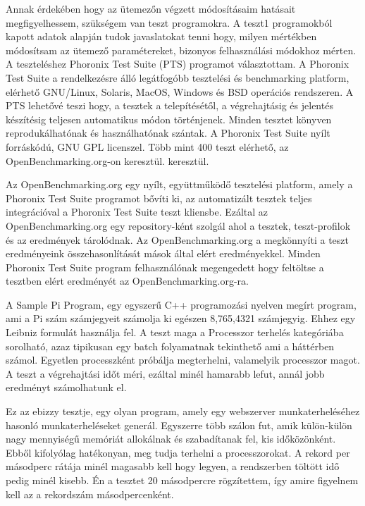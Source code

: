 
Annak érdekében hogy az ütemezőn végzett módosításaim hatásait megfigyelhessem, szükségem van teszt programokra. A teszt1 programokból kapott adatok alapján tudok javaslatokat tenni hogy, milyen mértékben módosítsam az ütemező paramétereket, bizonyos felhasználási módokhoz mérten.
A teszteléshez Phoronix Test Suite (PTS) programot választottam.
A Phoronix Test Suite a rendelkezésre álló legátfogóbb tesztelési és benchmarking platform, elérhető GNU/Linux, Solaris, MacOS, Windows és BSD operációs rendszeren.
A PTS lehetővé teszi hogy, a tesztek a telepítésétől, a végrehajtásig és jelentés készítésig teljesen automatikus módon történjenek.
Minden tesztet könyven reprodukálhatónak és használhatónak szántak.
A Phoronix Test Suite nyílt forráskódú, GNU GPL licenszel.
Több mint 400 teszt elérhető, az OpenBenchmarking.org-on keresztül. keresztül.


Az OpenBenchmarking.org egy nyílt, együttműködő tesztelési platform, amely a Phoronix Test Suite programot bővíti ki, az automatizált tesztek teljes integrációval a Phoronix Test Suite teszt kliensbe.
Ezáltal az OpenBenchmarking.org egy repository-ként szolgál ahol a tesztek, teszt-profilok és az eredmények tárolódnak.
Az OpenBenchmarking.org a megkönnyíti a teszt eredményeink összehasonlítását mások által elért eredményekkel.
Minden Phoronix Test Suite program felhasználónak megengedett hogy feltöltse a tesztben elért eredményét az OpenBenchmarking.org-ra.


A  Sample Pi Program, egy egyszerű C++ programozási nyelven megírt program, ami a Pi szám számjegyeit számolja ki egészen 8,765,4321 számjegyig. Ehhez egy Leibniz formulát használja fel. A teszt maga a Processzor terhelés kategóriába sorolható, azaz tipikusan egy batch folyamatnak tekinthető ami a háttérben számol. Egyetlen processzként próbálja megterhelni, valamelyik processzor magot. 
A teszt a végrehajtási időt méri, ezáltal minél hamarabb lefut, annál jobb eredményt számolhatunk el.


Ez az ebizzy tesztje, egy olyan program, amely egy webszerver munkaterheléséhez hasonló munkaterheléseket generál. Egyszerre több szálon fut, amik külön-külön nagy mennyiségű memóriát allokálnak és szabadítanak fel, kis időközönként. Ebből kifolyólag hatékonyan, meg tudja terhelni a processzorokat. A rekord per másodperc rátája minél magasabb kell hogy legyen, a rendszerben töltött idő pedig minél kisebb. Én a tesztet 20 másodpercre rögzítettem, így amire figyelnem kell az a rekordszám másodpercenként.

